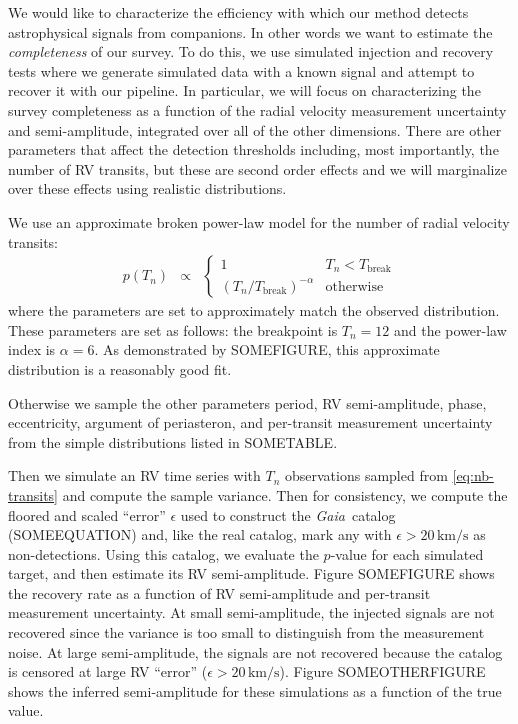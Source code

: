 \documentclass[modern, letterpaper]{aastex63}
\newcommand{\project}[1]{\textsl{#1}}
\newcommand{\Gaia}{\project{Gaia}}
\begin{document}
We would like to characterize the efficiency with which our method detects astrophysical signals from companions.
In other words we want to estimate the \emph{completeness} of our survey.
To do this, we use simulated injection and recovery tests where we generate simulated data with a known signal and attempt to recover it with our pipeline.
In particular, we will focus on characterizing the survey completeness as a function of the radial velocity measurement uncertainty and semi-amplitude, integrated over all of the other dimensions.
There are other parameters that affect the detection thresholds including, most importantly, the number of RV transits, but these are second order effects and we will marginalize over these effects using realistic distributions.

We use an approximate broken power-law model for the number of radial velocity transits:
\begin{eqnarray}
	\label{eq:nb-transits}
	p(T_n) &\propto& \left\{\begin{array}{ll}
	1                                  & T_n < T_\mathrm{break} \\
	(T_n / T_\mathrm{break})^{-\alpha} & \mathrm{otherwise}
	\end{array} \right.
\end{eqnarray}
where the parameters are set to approximately match the observed distribution.
These parameters are set as follows: the breakpoint is $T_n = 12$ and the power-law index is $\alpha = 6$.
As demonstrated by SOMEFIGURE, this approximate distribution is a reasonably good fit.

Otherwise we sample the other parameters period, RV semi-amplitude, phase, eccentricity, argument of periasteron, and per-transit measurement uncertainty from the simple distributions listed in SOMETABLE.

Then we simulate an RV time series with $T_n$ observations sampled from \autoref{eq:nb-transits} and compute the sample variance.
Then for consistency, we compute the floored and scaled ``error'' $\epsilon$ used to construct the \Gaia\ catalog (SOMEEQUATION) and, like the real catalog, mark any with $\epsilon > 20\,\mathrm{km/s}$ as non-detections.
Using this catalog, we evaluate the $p$-value for each simulated target, and then estimate its RV semi-amplitude.
Figure SOMEFIGURE shows the recovery rate as a function of RV semi-amplitude and per-transit measurement uncertainty.
At small semi-amplitude, the injected signals are not recovered since the variance is too small to distinguish from the measurement noise.
At large semi-amplitude, the signals are not recovered because the catalog is censored at large RV ``error'' ($\epsilon > 20\,\mathrm{km/s}$).
Figure SOMEOTHERFIGURE shows the inferred semi-amplitude for these simulations as a function of the true value.
\end{document}
